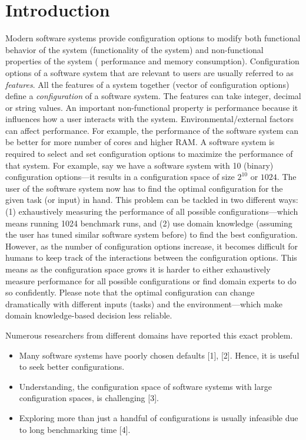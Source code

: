 \chapter{Introduction}
\label{chapter:one}


Modern software systems provide configuration options to modify
both functional behavior of the system (functionality of the system) and non-functional properties of the system ( performance and memory
consumption). 
Configuration options of a software system that are relevant to users are usually referred to as
\textit{features}. All the features of a system together (vector of configuration options) define a \textit{configuration} of a software system. The features can take integer, decimal or string values.  An important non-functional property is performance because it influences how a user interacts with the system. 
Environmental/external factors can affect performance. For example, the performance of the software system can be better for more number of cores and higher RAM.  A software system is required to select and set configuration options to maximize the performance of that system. For example, say we have a software system with 10 (binary) configuration options---it results in a configuration space of size $2^{10}$ or $1024$. The user of the software system now has to find the optimal configuration for the given task (or input) in hand. 
This problem can be tackled in two different ways: (1) exhaustively measuring the performance of all possible configurations---which means running 1024 benchmark runs, and (2) use domain knowledge (assuming the user has tuned similar software system before) to find the best configuration. 
However, as the number of configuration options increase, it becomes difficult for humans to keep track of the interactions between the configuration options. This means as the configuration space grows it is harder to either exhaustively measure performance for all possible configurations or find domain experts to do so confidently. Please note that the optimal configuration can change dramatically with different inputs (tasks) and the environment---which make domain knowledge-based decision less reliable. 

Numerous researchers from different domains have reported this exact problem.
\begin{itemize}
\item Many software systems have poorly chosen defaults [1], [2]. Hence, it is useful to seek better configurations.
\item Understanding, the configuration space of software systems with large configuration spaces, is challenging [3].
\item Exploring more than just a handful of configurations is usually infeasible due to long benchmarking time [4].
\end{itemize}


